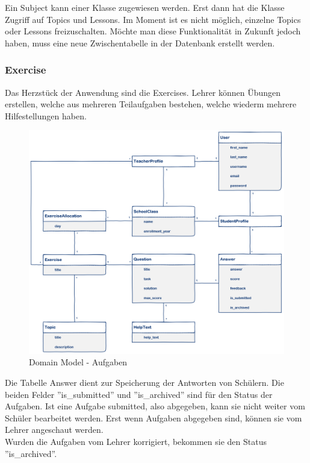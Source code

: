 Ein Subject kann einer Klasse zugewiesen werden. Erst dann hat die Klasse Zugriff auf Topics und Lessons. Im Moment ist es nicht möglich, einzelne Topics oder Lessons freizuschalten. Möchte man diese Funktionalität in Zukunft jedoch haben, muss eine neue Zwischentabelle in der Datenbank erstellt werden.

\newpage
\subsubsection*{Exercise}
Das Herzstück der Anwendung sind die Exercises. Lehrer können Übungen erstellen, welche aus mehreren Teilaufgaben bestehen, welche wiederm mehrere Hilfestellungen haben. 

\begin{figure}[H]
\begin{center}
	\includegraphics[width=\textwidth, keepaspectratio]{images/domain_model_exercise.png}
	\caption{Domain Model - Aufgaben}
	\label{fig:domain_model_exercise}
\end{center}
\end{figure}

Die Tabelle Answer dient zur Speicherung der Antworten von Schülern. Die beiden Felder ''is\_submitted'' und ''is\_archived'' sind für den Status der Aufgaben. Ist eine Aufgabe submitted, also abgegeben, kann sie nicht weiter vom Schüler bearbeitet werden. Erst wenn Aufgaben abgegeben sind, können sie vom Lehrer angeschaut werden. \\ 
Wurden die Aufgaben vom Lehrer korrigiert, bekommen sie den Status ''is\_archived''.

